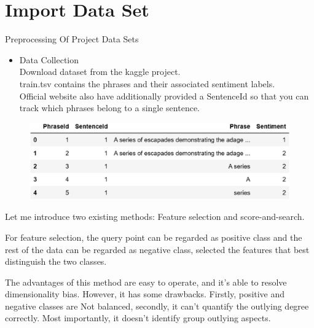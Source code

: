 \documentclass[
 size=14pt,
 paper=smartboard,  %
 mode=present, 		%
 display=slides, 	%
 style=tuliplab,  	%
 pauseslide,
 fleqn,leqno]{powerdot}
\begin{document}


\section{Import Data Set}


\begin{slide}{Preprocessing Of Project Data Sets}
\begin{itemize}
  \item Data Collection 
  \\Download dataset from the kaggle project.
  \\train.tsv contains the phrases and their associated sentiment labels. 
\\Official website also have additionally provided a SentenceId 
so that you can track which phrases belong to a single sentence.
\end{itemize}
  \begin{figure}[htbp]
    \centering
    \begin{minipage}[t]{0.58\textwidth}
      \centering
      \includegraphics[width=1.2\textwidth]{logos/train.eps}
      \vspace{0.4em}
    \end{minipage}
  \end{figure}
\bigskip





\begin{note}
Let me introduce two existing methods:
Feature selection and score-and-search.

For feature selection,
the query point can be regarded as positive class and
the rest of the data can be regarded as negative class,
selected the features that best distinguish the two classes.

The advantages of this method are easy to operate,
and it's able to resolve dimensionality bias.
However, it has some drawbacks.
Firstly,
positive and negative classes are Not balanced,
secondly,
it can't quantify the outlying degree correctly.
Most importantly,
it doesn't identify group outlying aspects.
\end{note}

\end{slide}
\end{document}
